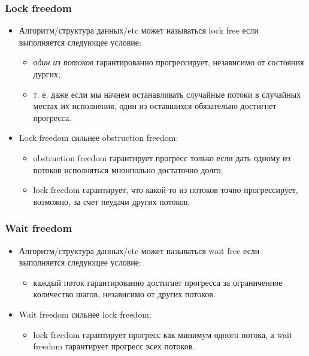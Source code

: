 \begin{frame}
\frametitle{Lock freedom}
\begin{itemize}
  \item Алгоритм/структура данных/etc может называться lock free если
  выполняется следующее условие:
  \begin{itemize}
    \item \emph{один из потоков} гарантированно прогрессирует, независимо от
    состояния дургих;
    \item т. е. даже если мы начнем останавливать случайные потоки в случайных
    местах их исполнения, один из оставшихся обязательно достигнет прогресса.
  \end{itemize}
  \item Lock freedom сильнее obstruction freedom:
  \begin{itemize}
    \item obstruction freedom гарантирует прогресс только если дать одному из
    потоков исполняться мнонпольно достаточно долго;
    \item lock freedom гарантирует, что какой-то из потоков точно прогрессирует,    возможно, за счет неудачи других потоков.
  \end{itemize}
\end{itemize}
\end{frame}

\begin{frame}
\frametitle{Wait freedom}
\begin{itemize}
  \item Алгоритм/структура данных/etc может называться wait free если
  выполняется следующее условие:
  \begin{itemize}
    \item каждый поток гарантированно достигает прогресса за ограниченное
    количество шагов, независимо от других потоков.
  \end{itemize}
  \item Wait freedom сильнее lock freedom:
  \begin{itemize}
    \item lock freedom гарантирует прогресс как минимум одного потока, а wait
    freedom гарантирует прогресс всех потоков.
  \end{itemize}
\end{itemize}
\end{frame}
